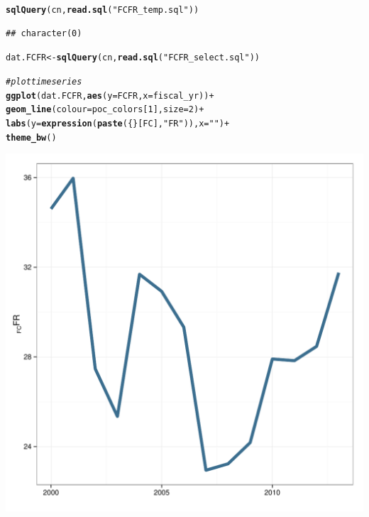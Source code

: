\documentclass[12pt]{article}\usepackage[]{graphicx}\usepackage[]{color}
\makeatletter
\def\maxwidth{ %
  \ifdim\Gin@nat@width>\linewidth
    \linewidth
  \else
    \Gin@nat@width
  \fi
}
\newcommand{\hlnum}[1]{\textcolor[rgb]{0.686,0.059,0.569}{#1}}%
\newcommand{\hlstr}[1]{\textcolor[rgb]{0.192,0.494,0.8}{#1}}%
\newcommand{\hlcom}[1]{\textcolor[rgb]{0.678,0.584,0.686}{\textit{#1}}}%
\newcommand{\hlopt}[1]{\textcolor[rgb]{0,0,0}{#1}}%
\newcommand{\hlstd}[1]{\textcolor[rgb]{0.345,0.345,0.345}{#1}}%
\newcommand{\hlkwb}[1]{\textcolor[rgb]{0.69,0.353,0.396}{#1}}%
\newcommand{\hlkwc}[1]{\textcolor[rgb]{0.333,0.667,0.333}{#1}}%
\newcommand{\hlkwd}[1]{\textcolor[rgb]{0.737,0.353,0.396}{\textbf{#1}}}%
\newenvironment{kframe}{%
 \def\at@end@of@kframe{}%
 \ifinner\ifhmode%
  \def\at@end@of@kframe{\end{minipage}}%
  \begin{minipage}{\columnwidth}%
 \fi\fi%
 \def\FrameCommand##1{\hskip\@totalleftmargin \hskip-\fboxsep
 \colorbox{shadecolor}{##1}\hskip-\fboxsep
     \hskip-\linewidth \hskip-\@totalleftmargin \hskip\columnwidth}%
 \MakeFramed {\advance\hsize-\width
   \@totalleftmargin\z@ \linewidth\hsize
   \@setminipage}}%
 {\par\unskip\endMakeFramed%
 \at@end@of@kframe}
\newenvironment{knitrout}{}{} %
\makeatother
\begin{document}
\begin{knitrout}
\color{fgcolor}\begin{kframe}
\begin{alltt}
\hlkwd{sqlQuery}\hlstd{(cn,} \hlkwd{read.sql}\hlstd{(}\hlstr{"FCFR_temp.sql"}\hlstd{))}
\end{alltt}
\begin{verbatim}
## character(0)
\end{verbatim}
\begin{alltt}
\hlstd{dat.FCFR} \hlkwb{<-} \hlkwd{sqlQuery}\hlstd{(cn,} \hlkwd{read.sql}\hlstd{(}\hlstr{"FCFR_select.sql"}\hlstd{))}

\hlcom{#plot time series}
\hlkwd{ggplot}\hlstd{(dat.FCFR,} \hlkwd{aes}\hlstd{(}\hlkwc{y}\hlstd{=FCFR,} \hlkwc{x}\hlstd{=fiscal_yr))} \hlopt{+}
  \hlkwd{geom_line}\hlstd{(}\hlkwc{colour}\hlstd{=poc_colors[}\hlnum{1}\hlstd{],} \hlkwc{size}\hlstd{=}\hlnum{2}\hlstd{)} \hlopt{+}
  \hlkwd{labs}\hlstd{(}\hlkwc{y} \hlstd{=} \hlkwd{expression}\hlstd{(}\hlkwd{paste}\hlstd{(\{\}[FC],} \hlstr{"FR"}\hlstd{)),} \hlkwc{x} \hlstd{=} \hlstr{""}\hlstd{)} \hlopt{+}
  \hlkwd{theme_bw}\hlstd{()}
\end{alltt}
\end{kframe}

{\centering \includegraphics[width=\maxwidth]{figure/_FCFR} 

}



\end{knitrout}
\end{document}

